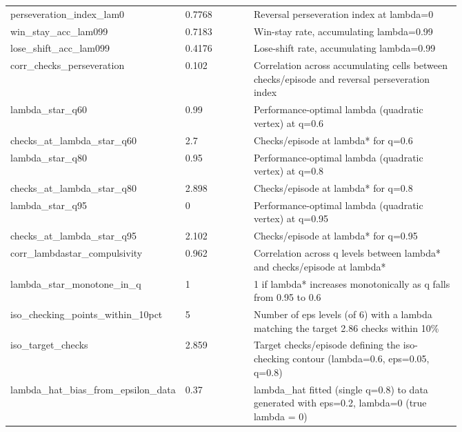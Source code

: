 \documentclass[11pt,a4paper]{article}
\begin{document}
\begin{table}[ht]
\begin{tabular}{p{0.3\linewidth} l p{0.46\linewidth}}
perseveration\_\allowbreak{}index\_\allowbreak{}lam0 & 0.7768 & Reversal perseveration index at lambda=0\\
win\_\allowbreak{}stay\_\allowbreak{}acc\_\allowbreak{}lam099 & 0.7183 & Win-stay rate, accumulating lambda=0.99\\
lose\_\allowbreak{}shift\_\allowbreak{}acc\_\allowbreak{}lam099 & 0.4176 & Lose-shift rate, accumulating lambda=0.99\\
corr\_\allowbreak{}checks\_\allowbreak{}perseveration & 0.102 & Correlation across accumulating cells between checks/episode and reversal perseveration index\\
lambda\_\allowbreak{}star\_\allowbreak{}q60 & 0.99 & Performance-optimal lambda (quadratic vertex) at q=0.6\\
checks\_\allowbreak{}at\_\allowbreak{}lambda\_\allowbreak{}star\_\allowbreak{}q60 & 2.7 & Checks/episode at lambda* for q=0.6\\
lambda\_\allowbreak{}star\_\allowbreak{}q80 & 0.95 & Performance-optimal lambda (quadratic vertex) at q=0.8\\
checks\_\allowbreak{}at\_\allowbreak{}lambda\_\allowbreak{}star\_\allowbreak{}q80 & 2.898 & Checks/episode at lambda* for q=0.8\\
lambda\_\allowbreak{}star\_\allowbreak{}q95 & 0 & Performance-optimal lambda (quadratic vertex) at q=0.95\\
checks\_\allowbreak{}at\_\allowbreak{}lambda\_\allowbreak{}star\_\allowbreak{}q95 & 2.102 & Checks/episode at lambda* for q=0.95\\
corr\_\allowbreak{}lambdastar\_\allowbreak{}compulsivity & 0.962 & Correlation across q levels between lambda* and checks/episode at lambda*\\
lambda\_\allowbreak{}star\_\allowbreak{}monotone\_\allowbreak{}in\_\allowbreak{}q & 1 & 1 if lambda* increases monotonically as q falls from 0.95 to 0.6\\
iso\_\allowbreak{}checking\_\allowbreak{}points\_\allowbreak{}within\_\allowbreak{}10pct & 5 & Number of eps levels (of 6) with a lambda matching the target 2.86 checks within 10\%\\
iso\_\allowbreak{}target\_\allowbreak{}checks & 2.859 & Target checks/episode defining the iso-checking contour (lambda=0.6, eps=0.05, q=0.8)\\
lambda\_\allowbreak{}hat\_\allowbreak{}bias\_\allowbreak{}from\_\allowbreak{}epsilon\_\allowbreak{}data & 0.37 & lambda\_hat fitted (single q=0.8) to data generated with eps=0.2, lambda=0 (true lambda = 0)\\

\end{tabular}
\end{table}
\end{document}
